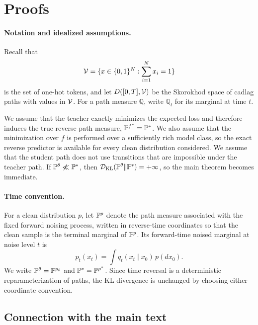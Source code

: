 \section{Proofs}
\label{app: proofs}

\paragraph{Notation and idealized assumptions.}
Recall that
\[
    \mathcal{V}=\{x\in\{0,1\}^N:\sum_{i=1}^N x_i=1\}
\]
is the set of one-hot tokens, and let \(D([0,T],\mathcal{V})\) be the Skorokhod space of
cadlag paths with values in \(\mathcal{V}\). For a path measure \(\mathbb Q\), write
\(\mathbb Q_t\) for its marginal at time \(t\).

We assume that the teacher exactly minimizes the expected loss and therefore
induces the true reverse path measure, \(\mathbb{P}^{f^*}=\mathbb{P}^*\).
We also assume that the minimization over \(f\) is performed over a sufficiently
rich model class, so the exact reverse predictor is available for every clean
distribution considered. We assume that the student path does not use
transitions that are impossible under the teacher path. If
\(\mathbb{P}^\theta\not\ll\mathbb{P}^*\), then
\(\mathcal{D}_{\mathrm{KL}}(\mathbb{P}^\theta\|\mathbb{P}^*)=+\infty\), so the main theorem becomes
immediate.

\paragraph{Time convention.}
For a clean distribution \(p\), let \(\mathbb{P}^p\) denote the path measure associated
with the fixed forward noising process, written in reverse-time coordinates so
that the clean sample is the terminal marginal of \(\mathbb{P}^p\). Its forward-time
noised marginal at noise level \(t\) is
\[
    p_t(x_t)=\int q_t(x_t\mid x_0)\,p(dx_0).
\]
We write \(\mathbb{P}^\theta=\mathbb{P}^{p_\theta}\) and \(\mathbb{P}^*=\mathbb{P}^{p^*}\). Since time
reversal is a deterministic reparameterization of paths, the KL divergence is
unchanged by choosing either coordinate convention.

\subsection{Connection with the main text}
\label{app: connection with the main text}

